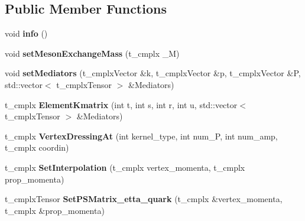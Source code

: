 \subsection*{Public Member Functions}
\begin{DoxyCompactItemize}
\item 
\hypertarget{class_c___kernel___r_l___p_s_ab0bfc75c8acd42ade61f354e6203c74d}{void {\bfseries info} ()}\label{class_c___kernel___r_l___p_s_ab0bfc75c8acd42ade61f354e6203c74d}

\item 
\hypertarget{class_c___kernel___r_l___p_s_ad25fe96108843a814f55b5c619c5187e}{void {\bfseries set\-Meson\-Exchange\-Mass} (t\-\_\-cmplx \-\_\-\-M)}\label{class_c___kernel___r_l___p_s_ad25fe96108843a814f55b5c619c5187e}

\item 
\hypertarget{class_c___kernel___r_l___p_s_a5d635af404489de546e6240b8d2a9265}{void {\bfseries set\-Mediators} (t\-\_\-cmplx\-Vector \&k, t\-\_\-cmplx\-Vector \&p, t\-\_\-cmplx\-Vector \&P, std\-::vector$<$ t\-\_\-cmplx\-Tensor $>$ \&Mediators)}\label{class_c___kernel___r_l___p_s_a5d635af404489de546e6240b8d2a9265}

\item 
\hypertarget{class_c___kernel___r_l___p_s_a57c4a7e5c0c4db8d61a8b547ae9f23af}{t\-\_\-cmplx {\bfseries Element\-Kmatrix} (int t, int s, int r, int u, std\-::vector$<$ t\-\_\-cmplx\-Tensor $>$ \&Mediators)}\label{class_c___kernel___r_l___p_s_a57c4a7e5c0c4db8d61a8b547ae9f23af}

\item 
\hypertarget{class_c___kernel___r_l___p_s_a6323065c3d5d268f755a7107ffea5506}{t\-\_\-cmplx {\bfseries Vertex\-Dressing\-At} (int kernel\-\_\-type, int num\-\_\-\-P, int num\-\_\-amp, t\-\_\-cmplx coordin)}\label{class_c___kernel___r_l___p_s_a6323065c3d5d268f755a7107ffea5506}

\item 
\hypertarget{class_c___kernel___r_l___p_s_abbad3a288bd15c6d4ce71f2880f096cf}{t\-\_\-cmplx {\bfseries Set\-Interpolation} (t\-\_\-cmplx vertex\-\_\-momenta, t\-\_\-cmplx prop\-\_\-momenta)}\label{class_c___kernel___r_l___p_s_abbad3a288bd15c6d4ce71f2880f096cf}

\item 
\hypertarget{class_c___kernel___r_l___p_s_a59837c29b2f0f580bba3f506998b5095}{t\-\_\-cmplx\-Tensor {\bfseries Set\-P\-S\-Matrix\-\_\-etta\-\_\-quark} (t\-\_\-cmplx \&vertex\-\_\-momenta, t\-\_\-cmplx \&prop\-\_\-momenta)}\label{class_c___kernel___r_l___p_s_a59837c29b2f0f580bba3f506998b5095}


\end{DoxyCompactItemize}
